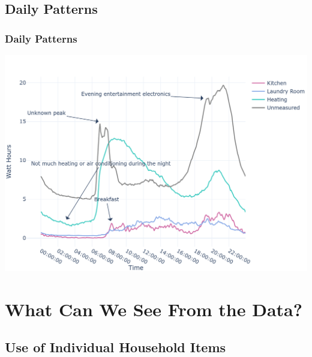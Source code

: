 \documentclass[10pt]{beamer}
\begin{document}
\subsection{Daily Patterns}

\begin{frame}
\frametitle{Daily Patterns}

\bigskip
{
    \centering
    \includegraphics[width=\textwidth,height=\textheight,keepaspectratio]{daily_seasonality.png}
    \par
}
\bigskip

\end{frame}


\section{What Can We See From the Data?}

\subsection{Use of Individual Household Items}
\end{document}
